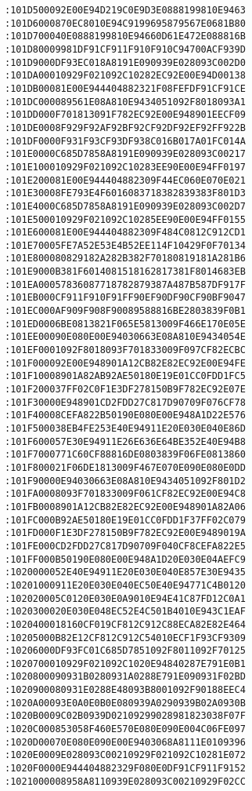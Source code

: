 \begin{lstlisting}[language={}, basicstyle=\scriptsize, caption=Машинний код]
:101D500092E00E94D219C0E9D3E0888199810E9463
:101D6000870EC8010E94C9199695879567E0681B80
:101D700040E0888199810E94660D61E472E088816B
:101D80009981DF91CF911F910F910C94700ACF939D
:101D9000DF93EC018A8191E090939E028093C002D0
:101DA00010929F021092C10282EC92E00E94D00138
:101DB00081E00E944404882321F08FEFDF91CF91CE
:101DC000089561E08A810E9434051092F8018093A1
:101DD000F701813091F782EC92E00E948901EECF09
:101DE0008F929F92AF92BF92CF92DF92EF92FF922B
:101DF0000F931F93CF93DF938C016B017A01FC014A
:101E0000C685D7858A8191E090939E028093C00217
:101E100010929F021092C10283EE90E00E94FF0197
:101E200081E00E944404882309F44EC060E070E021
:101E30008FE793E4F6016083718382839383F801D3
:101E4000C685D7858A8191E090939E028093C002D7
:101E500010929F021092C10285EE90E00E94FF0155
:101E600081E00E944404882309F484C0812C912CD1
:101E70005FE7A52E53E4B52EE114F10429F0F70134
:101E800080829182A282B382F70180819181A281B6
:101E9000B381F6014081518162817381F8014683EB
:101EA00057836087718782879387A487B587DF917F
:101EB000CF911F910F91FF90EF90DF90CF90BF9047
:101EC000AF909F908F90089588816BE2803839F0B1
:101ED0006BE0813821F065E5813009F466E170E05E
:101EE00090E080E00E94030663E08A810E9434054E
:101EF0001092F8018093F701833009F097CF82ECBC
:101F000092E00E948901A12CB82E82EC92E00E94FE
:101F10008901A82AB92AE50180E19E01CC0FDD1FC5
:101F200037FF02C0F1E3DF278150B9F782EC92E07E
:101F30000E948901CD2FDD27C817D90709F076CF78
:101F40008CEFA822B50190E080E00E948A1D22E576
:101F500038EB4FE253E40E94911E20E030E040E86D
:101F600057E30E94911E26E636E64BE352E40E94B8
:101F7000771C60CF88816DE0803839F06FE0813860
:101F800021F06DE1813009F467E070E090E080E0DD
:101F90000E94030663E08A810E9434051092F801D2
:101FA0008093F701833009F061CF82EC92E00E94C8
:101FB0008901A12CB82E82EC92E00E948901A82A06
:101FC000B92AE50180E19E01CC0FDD1F37FF02C079
:101FD000F1E3DF278150B9F782EC92E00E9489019A
:101FE000CD2FDD27C817D90709F040CF8CEFA822E5
:101FF000B50190E080E00E948A1D20E030E04AEFC9
:1020000052E40E94911E20E030E040E857E30E9435
:10201000911E20E030E040EC50E40E94771C4B0120
:102020005C0120E030E0A9010E94E41C87FD12C0A1
:1020300020E030E048EC52E4C501B4010E943C1EAF
:1020400018160CF019CF812C912C88ECA82E82E464
:10205000B82E12CF812C912C54010ECF1F93CF9309
:10206000DF93FC01C685D7851092F8011092F70125
:1020700010929F021092C1020E94840287E791E0B1
:1020800090931B0280931A0288E791E090931F02BD
:1020900080931E0288E48093B8001092F90188EEC4
:1020A00093E0A0E0B0E080939A0290939B02A0930B
:1020B0009C02B0939D02109299028981823038F07F
:1020C000853058F460E570E080E090E004C06FE097
:1020D00070E080E090E00E9403068A8111E0109396
:1020E0009E028093C00210929F021092C10281E072
:1020F0000E944404882329F080E0DF91CF911F9152
:1021000008958A8110939E028093C00210929F02CC

\end{lstlisting}
